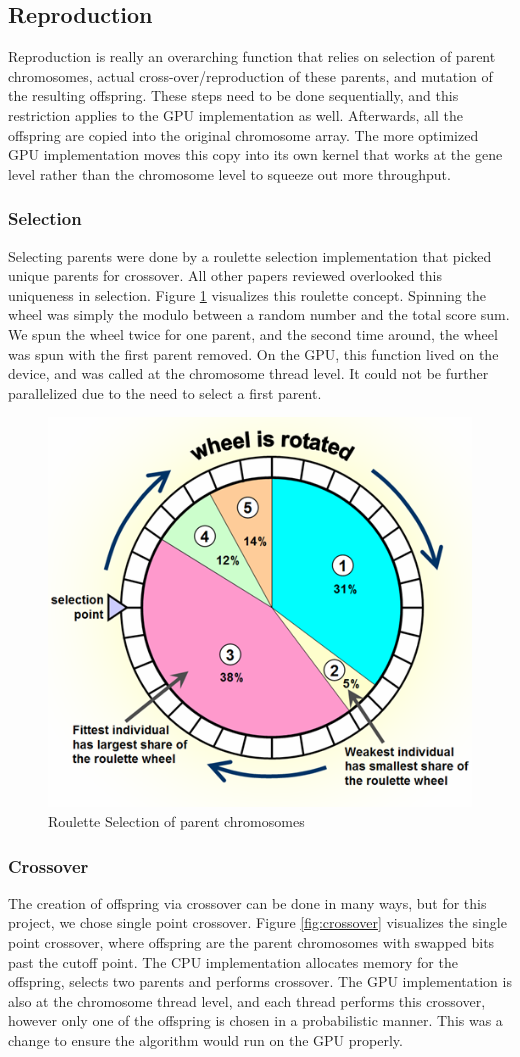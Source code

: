 \documentclass[11pt]{article}       %
\begin{document}
\subsection{Reproduction}
Reproduction is really an overarching function that relies on selection of parent chromosomes, actual cross-over/reproduction of these parents, and mutation of the resulting offspring. These steps need to be done sequentially, and this restriction applies to the GPU implementation as well. Afterwards, all the offspring are copied into the original chromosome array. The more optimized GPU implementation moves this copy into its own kernel that works at the gene level rather than the chromosome level to squeeze out more throughput.

\subsubsection{Selection}
Selecting parents were done by a roulette selection implementation that picked unique parents for crossover. All other papers reviewed overlooked this uniqueness in selection. Figure \ref{fig:roulette} visualizes this roulette concept. Spinning the wheel was simply the modulo between a random number and the total score sum. We spun the wheel twice for one parent, and the second time around, the wheel was spun with the first parent removed. On the GPU, this function lived on the device, and was called at the chromosome thread level. It could not be further parallelized due to the need to select a first parent.

\begin{figure}[h]
    \centering
    \includegraphics[width=0.5\linewidth]{Figures/roulette_selection.png}
    \caption{Roulette Selection of parent chromosomes}
    \label{fig:roulette}
\end{figure}

\subsubsection{Crossover}
The creation of offspring via crossover can be done in many ways, but for this project, we chose single point crossover. Figure \ref{fig:crossover} visualizes the single point crossover, where offspring are the parent chromosomes with swapped bits past the cutoff point. The CPU implementation allocates memory for the offspring, selects two parents and performs crossover. The GPU implementation is also at the chromosome thread level, and each thread performs this crossover, however only one of the offspring is chosen in a probabilistic manner. This was a change to ensure the algorithm would run on the GPU properly.
\end{document}
